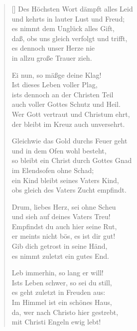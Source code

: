 \begin{multicols}{2}
\begin{verse}[\versewidth]
 Des Höchsten Wort dämpft alles Leid\\
und kehrts in lauter Lust und Freud;\\
es nimmt dem Unglück alles Gift,\\
daß, obs uns gleich verfolgt und trifft,\\
es dennoch unser Herze nie\\
in allzu große Trauer zieh.

 Ei nun, so mäßge deine Klag!\\
Ist dieses Leben voller Plag,\\
ists dennoch an der Christen Teil\\
auch voller Gottes Schutz und Heil.\\
Wer Gott vertraut und Christum ehrt,\\
der bleibt im Kreuz auch unversehrt.

 Gleichwie das Gold durchs Feuer geht\\
und in dem Ofen wohl besteht,\\
so bleibt ein Christ durch Gottes Gnad\\
im Elendsofen ohne Schad;\\
ein Kind bleibt seines Vaters Kind,\\
obs gleich des Vaters Zucht empfindt.

 Drum, liebes Herz, sei ohne Scheu\\
und sieh auf deines Vaters Treu!\\
Empfindst du auch hier seine Rut,\\
er meints nicht bös, es ist dir gut!\\
Gib dich getrost in seine Händ,\\
es nimmt zuletzt ein gutes End.

 Leb immerhin, so lang er will!\\
Ists Leben schwer, so sei du still,\\
es geht zuletzt in Freuden aus:\\
Im Himmel ist ein schönes Haus,\\
da, wer nach Christo hier gestrebt,\\
mit Christi Engeln ewig lebt!

\end{verse}
\end{multicols}
